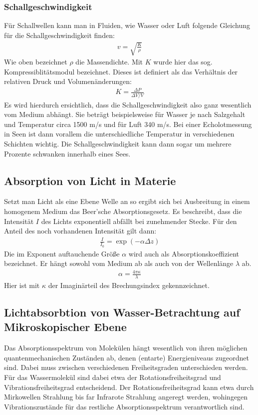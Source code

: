 \documentclass[12pt,a4paper,titlepage,headinclude,bibtotoc]{scrartcl}
\begin{document}
\subsubsection{Schallgeschwindigkeit}
Für Schallwellen kann man in Fluiden, wie Wasser oder Luft folgende Gleichung für die Schallgeschwindigkeit finden:
\begin{align}
 v = \sqrt{  \frac{K}{\rho}  }
\end{align}
Wie oben bezeichnet $\rho$ die Massendichte. Mit $K$ wurde hier das sog. Kompressiblitätsmodul bezeichnet. Dieses ist definiert als das Verhältnis der relativen Druck und Volumenänderungen:
\begin{align}
 K =  \frac{\Delta P}{\Delta V / V }
\end{align}
Es wird hierdurch ersichtlich, dass die Schallgeschwindigkeit also ganz wesentlich vom Medium abhängt. 
Sie beträgt beispielsweise für Wasser je nach Salzgehalt und Temperatur circa 1500 m/s  und für Luft 340 m/s.
Bei einer Echolotmessung in Seen ist dann vorallem die unterschiedliche Temperatur in verschiedenen Schichten 
wichtig. Die Schallgeschwindigkeit kann dann sogar um mehrere Prozente schwanken innerhalb eines Sees.



\subsection{Absorption von Licht in Materie}
Setzt man Licht als eine Ebene Welle an so ergibt sich bei Ausbreitung in einem homogenem Medium das Beer'sche Absorptionsgesetz.
Es beschreibt, dass die Intensität $I$ des Lichts exponentiell abfällt bei zunehmender Stecke.
Für den Anteil des noch vorhandenen Intensität gilt dann:
\begin{align}
 \frac{I}{I_0}  =  \exp(- \alpha  \Delta z)
\end{align}
Die im Exponent auftauchende Größe $\alpha$ wird auch als Absorptionskoeffizient bezeichnet. Er hängt sowohl vom Medium ab als auch von der Wellenlänge $\lambda$ ab.
\begin{align}
 \alpha= \frac{4 \pi \kappa}{\lambda}
\end{align}
Hier ist mit $\kappa$ der Imaginärteil des Brechungsindex gekennzeichnet.

\subsection{Lichtabsorbtion von Wasser-Betrachtung auf Mikroskopischer Ebene}
Das Absorptionsspektrum von Molekülen hängt wesentlich von ihren möglichen 
quantenmechanischen Zuständen ab, denen (entarte) Energieniveaus zugeordnet sind. Dabei muss zwischen verschiedenen Freiheitsgraden
unterschieden werden. Für das Wassermolekül sind dabei etwa der Rotationsfreiheitsgrad und Vibrationsfreiheitsgrad entscheidend.
Der Rotationsfreiheitsgrad kann etwa durch Mirkowellen Strahlung bis far Infrarote Strahlung angeregt werden, wohingegen Vibrationszustände für das restliche Absorptionsspektrum verantwortlich sind.
\end{document}
